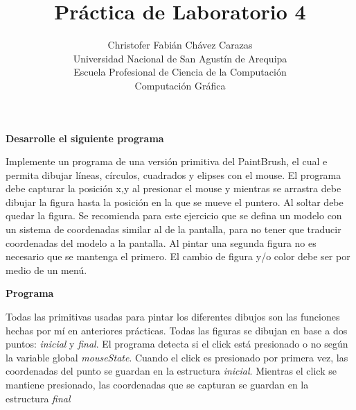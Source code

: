 \documentclass[a4paper,12pt]{article}
\begin{document}
\title{Práctica de Laboratorio 4}
\author{
Christofer Fabián Chávez Carazas \\
\small{Universidad Nacional de San Agustín de Arequipa} \\
\small{Escuela Profesional de Ciencia de la Computación} \\
\small{Computación Gráfica}
}
\date{}

\maketitle

\begin{large}
 \textbf{Desarrolle el siguiente programa}
\end{large}

Implemente un programa de una versión primitiva del PaintBrush, el cual e permita dibujar líneas, círculos, cuadrados y elipses con el mouse. El programa debe capturar la posición
x,y al presionar el mouse y mientras se arrastra debe dibujar la figura hasta la posición en la que se mueve el puntero. Al soltar debe quedar la figura.
Se recomienda para este ejercicio que se defina un modelo con un sistema de coordenadas similar al de la pantalla, para no tener que traducir coordenadas del modelo a la
pantalla. Al pintar una segunda figura no es necesario que se mantenga el primero. El cambio de figura y/o color debe ser por medio de un menú.

\begin{large}
 \textbf{Programa}
\end{large}

Todas las primitivas usadas para pintar los diferentes dibujos son las funciones hechas por mí en anteriores prácticas. Todas las figuras se dibujan en base
a dos puntos: \textit{inicial} y \textit{final}. El programa detecta si el click está presionado o no según la variable global \textit{mouseState}. Cuando el click es
presionado por primera vez, las coordenadas del punto se guardan en la estructura \textit{inicial}. Mientras el click se mantiene presionado, las coordenadas que se
capturan se guardan en la estructura \textit{final}
\end{document}
